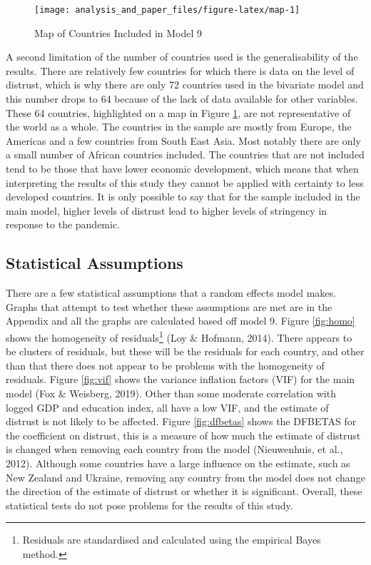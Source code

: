 \documentclass[
  12pt,
]{article}
\begin{document}
\begin{figure}
\texttt{[image: analysis\_and\_paper\_files/figure-latex/map-1]} \caption{Map of Countries Included in Model 9}\label{fig:map}
\end{figure}

A second limitation of the number of countries used is the generalisability of the results. There are relatively few countries for which there is data on the level of distrust, which is why there are only 72 countries used in the bivariate model and this number drops to 64 because of the lack of data available for other variables. These 64 countries, highlighted on a map in Figure \ref{fig:map}, are not representative of the world as a whole. The countries in the sample are mostly from Europe, the Americas and a few countries from South East Asia. Most notably there are only a small number of African countries included. The countries that are not included tend to be those that have lower economic development, which means that when interpreting the results of this study they cannot be applied with certainty to less developed countries. It is only possible to say that for the sample included in the main model, higher levels of distrust lead to higher levels of stringency in response to the pandemic.\\

\hypertarget{statistical-assumptions}{%
\subsection{Statistical Assumptions}\label{statistical-assumptions}}

There are a few statistical assumptions that a random effects model makes. Graphs that attempt to test whether these assumptions are met are in the Appendix and all the graphs are calculated based off model 9. Figure \ref{fig:homo} shows the homogeneity of residuals\footnote{Residuals are standardised and calculated using the empirical Bayes method.} (Loy \& Hofmann, 2014). There appears to be clusters of residuals, but these will be the residuals for each country, and other than that there does not appear to be problems with the homogeneity of residuals. Figure \ref{fig:vif} shows the variance inflation factors (VIF) for the main model (Fox \& Weisberg, 2019). Other than some moderate correlation with logged GDP and education index, all have a low VIF, and the estimate of distrust is not likely to be affected. Figure \ref{fig:dfbetas} shows the DFBETAS for the coefficient on distrust, this is a measure of how much the estimate of distrust is changed when removing each country from the model (Nieuwenhuis, et al., 2012). Although some countries have a large influence on the estimate, such as New Zealand and Ukraine, removing any country from the model does not change the direction of the estimate of distrust or whether it is significant. Overall, these statistical tests do not pose problems for the results of this study.\\
\end{document}
